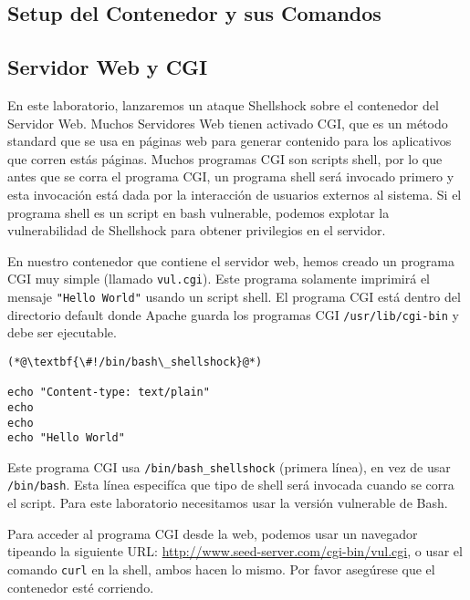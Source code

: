 \subsection{Setup del Contenedor y sus Comandos}




\subsection{Servidor Web y CGI}

En este laboratorio, lanzaremos un ataque Shellshock sobre el contenedor del Servidor Web. Muchos Servidores Web tienen activado CGI, que es un método standard 
que se usa en páginas web para generar contenido para los aplicativos que corren estás páginas. Muchos programas CGI son scripts shell, por lo que antes que se corra el programa CGI, un programa shell será invocado primero y esta invocación está dada por la interacción de usuarios externos al sistema. Si el programa shell es un script en bash vulnerable, podemos explotar la vulnerabilidad de Shellshock para obtener privilegios en el servidor.

En nuestro contenedor que contiene el servidor web, hemos creado un programa CGI muy simple (llamado \texttt{vul.cgi}). 
Este programa solamente imprimirá el mensaje {\tt "Hello World"} usando un script shell.
El programa CGI está dentro del directorio default donde Apache guarda los programas CGI \texttt{/usr/lib/cgi-bin} y debe ser ejecutable.

\begin{lstlisting}[caption=\texttt{vul.cgi}] 
(*@\textbf{\#!/bin/bash\_shellshock}@*)          

echo "Content-type: text/plain"
echo
echo
echo "Hello World"
\end{lstlisting}

Este programa CGI usa \texttt{/bin/bash\_shellshock} (primera línea), en vez de usar \texttt{/bin/bash}. Esta línea especifíca que tipo de shell será invocada cuando se corra el script. Para este laboratorio necesitamos usar la versión vulnerable de Bash.

Para acceder al programa CGI desde la web, podemos usar un navegador tipeando la siguiente URL: \url{http://www.seed-server.com/cgi-bin/vul.cgi}, o usar el  comando {\tt curl} en la shell, ambos hacen lo mismo. Por favor asegúrese que el contenedor esté corriendo.


